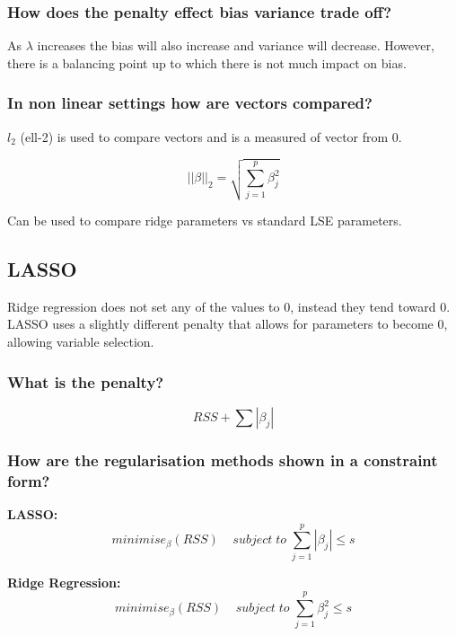\documentclass[11pt]{scrartcl} %
\begin{document}
\subsubsection{How does the penalty effect bias variance trade off?}

As \(\lambda\) increases the bias will also increase and variance will decrease. However, there
is a balancing point up to which there is not much impact on bias.

\subsubsection{In non linear settings how are vectors compared?}

\(l_2\) (ell-2) is used to compare vectors and is a measured of vector from 0.

\begin{equation}
	||\beta||_2=\sqrt{\sum^p_{j=1}{\beta_j^2}}
\end{equation}

Can be used to compare ridge parameters vs standard LSE parameters.

\subsection{LASSO}

Ridge regression does not set any of the values to 0, instead they tend toward 0. LASSO uses
a slightly different penalty that allows for parameters to become 0, allowing variable selection.

\subsubsection{What is the penalty?}

\begin{equation}
	RSS + \sum{|\beta_j|}
\end{equation}

\subsubsection{How are the regularisation methods shown in a constraint form?}

\textbf{LASSO:}
\begin{equation}
	minimise_{\beta}(RSS)\;\;\;\; subject\; to\; \sum^p_{j=1}{|\beta_j|} \leq s
\end{equation}

\textbf{Ridge Regression:}
\begin{equation}
	minimise_{\beta}(RSS)\;\;\;\; subject\; to\; \sum^p_{j=1}{\beta_j^2} \leq s
\end{equation}
\end{document}
